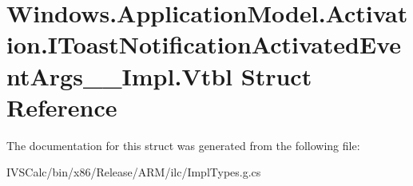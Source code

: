 \hypertarget{struct_windows_1_1_application_model_1_1_activation_1_1_i_toast_notification_activated_event_args_____impl_1_1_vtbl}{}\section{Windows.\+Application\+Model.\+Activation.\+I\+Toast\+Notification\+Activated\+Event\+Args\+\_\+\+\_\+\+Impl.\+Vtbl Struct Reference}
\label{struct_windows_1_1_application_model_1_1_activation_1_1_i_toast_notification_activated_event_args_____impl_1_1_vtbl}


The documentation for this struct was generated from the following file\+:\begin{DoxyCompactItemize}
\item 
I\+V\+S\+Calc/bin/x86/\+Release/\+A\+R\+M/ilc/Impl\+Types.\+g.\+cs\end{DoxyCompactItemize}
